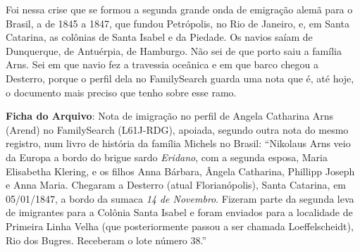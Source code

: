 \documentclass[
  brazilian,
  11pt,
  openany]{book}
\begin{document}
Foi nessa crise que se formou a segunda grande onda de emigração alemã
para o Brasil, a de 1845 a 1847, que fundou Petrópolis, no Rio de
Janeiro, e, em Santa Catarina, as colônias de Santa Isabel e da Piedade.
Os navios saíam de Dunquerque, de Antuérpia, de Hamburgo. Não sei de que
porto saiu a família Arns. Sei em que navio fez a travessia oceânica e
em que barco chegou a Desterro, porque o perfil dela no FamilySearch
guarda uma nota que é, até hoje, o documento mais preciso que tenho
sobre esse ramo.

\begin{ficha}

\textbf{Ficha do Arquivo}: Nota de imigração no perfil de Angela
Catharina Arns (Arend) no FamilySearch (L61J-RDG), apoiada, segundo
outra nota do mesmo registro, num livro de história da família Michels
no Brasil: ``Nikolaus Arns veio da Europa a bordo do brigue sardo
\emph{Eridano}, com a segunda esposa, Maria Elisabetha Klering, e os
filhos Anna Bárbara, Ângela Catharina, Phillipp Joseph e Anna Maria.
Chegaram a Desterro (atual Florianópolis), Santa Catarina, em
05/01/1847, a bordo da sumaca \emph{14 de Novembro}. Fizeram parte da
segunda leva de imigrantes para a Colônia Santa Isabel e foram enviados
para a localidade de Primeira Linha Velha (que posteriormente passou a
ser chamada Loeffelscheidt), Rio dos Bugres. Receberam o lote número
38.''

\end{ficha}
\end{document}
